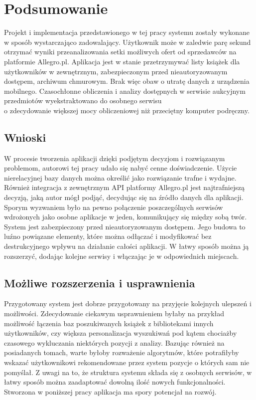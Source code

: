 \chapter{Podsumowanie}
\label{cha:podsumowanie}

Projekt i implementacja przedstawionego w tej pracy systemu zostały wykonane\\w sposób wystarczająco zadowalający. Użytkownik może w zaledwie parę sekund otrzymać wyniki przeanalizowania setki możliwych ofert od sprzedawców na platformie Allegro.pl. Aplikacja jest w stanie przetrzymywać listy książek dla użytkowników w zewnętrznym, zabezpieczonym przed nieautoryzowanym dostępem, archiwum chmurowym. Brak więc obaw o utratę danych z urządzenia mobilnego. Czasochłonne obliczenia i analizy dostępnych w serwisie aukcyjnym przedmiotów wyekstraktowano do osobnego serwisu\\o zdecydowanie większej mocy obliczeniowej niż przeciętny komputer podręczny.

\section{Wnioski}
W procesie tworzenia aplikacji dzięki podjętym decyzjom i rozwiązanym problemom, autorowi tej pracy udało się nabyć cenne doświadczenie. 
Użycie nierelacyjnej bazy danych można określić jako rozwiązanie trafne i wydajne. Również integracja z zewnętrznym API platformy Allegro.pl jest najtrafniejszą decyzją, jaką autor mógł podjąć, decydując się na źródło danych dla aplikacji.\newline
Sporym wyzwaniem było na pewno połączenie poszczególnych serwisów wdrożonych jako osobne aplikacje w jeden, komunikujący się między sobą twór.\newline
System jest zabezpieczony przed nieautoryzowanym dostępem. Jego budowa to luźno powiązane elementy, które można odłączać i modyfikować bez destrukcyjnego wpływu na działanie całości aplikacji.
W łatwy sposób można ją rozszerzyć, dodając kolejne serwisy i włączając je w odpowiednich miejscach.

\newpage
\section{Możliwe rozszerzenia i usprawnienia}
Przygotowany system jest dobrze przygotowany na przyjęcie kolejnych ulepszeń i możliwości.\newline
Zdecydowanie ciekawym usprawnieniem byłaby na przykład możliwość łączenia baz poszukiwanych książek z bibliotekami innych użytkowników, czy większa personalizacja wyszukiwań pod kątem chociażby czasowego wykluczania niektórych pozycji z analizy.\newline
Bazując również na posiadanych tomach, warte byłoby rozważenie algorytmów, które potrafiłyby wskazać użytkownikowi rekomendowane przez system pozycje o których sam nie pomyślał.
Z uwagi na to, że struktura systemu składa się z osobnych serwisów, w łatwy sposób można zaadaptować dowolną ilość nowych funkcjonalności.\newline
Stworzona w poniższej pracy aplikacja ma spory potencjał na rozwój.